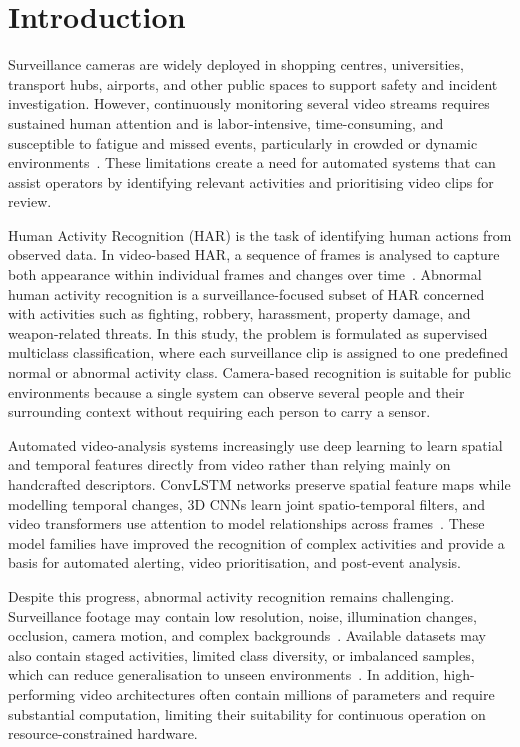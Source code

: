\documentclass[journal,article,submit,moreauthors]{Definitions/mdpi}
\begin{document}
    \section{Introduction}
    \label{sec:introduction}

    Surveillance cameras are widely deployed in shopping centres, universities, transport 
    hubs, airports, and other public spaces to support safety and incident investigation. 
    However, continuously monitoring several video streams requires sustained human 
    attention and is labor-intensive, time-consuming, and susceptible to fatigue and 
    missed events, particularly in crowded or dynamic 
    environments~\cite{arshad2022,mohan2019}. These limitations create a need for 
    automated systems that can assist operators by identifying relevant activities and 
    prioritising video clips for review.

    Human Activity Recognition (HAR) is the task of identifying human actions from 
    observed data. In video-based HAR, a sequence of frames is analysed to capture both 
    appearance within individual frames and changes over time~\cite{ozyer2021,khan2022}. 
    Abnormal human activity recognition is a surveillance-focused subset of HAR concerned 
    with activities such as fighting, robbery, harassment, property damage, and 
    weapon-related threats. In this study, the problem is formulated as supervised 
    multiclass classification, where each surveillance clip is assigned to one predefined 
    normal or abnormal activity class. Camera-based recognition is suitable for public 
    environments because a single system can observe several people and their surrounding 
    context without requiring each person to carry a sensor.

    Automated video-analysis systems increasingly use deep learning to learn spatial and 
    temporal features directly from video rather than relying mainly on handcrafted 
    descriptors. ConvLSTM networks preserve spatial feature maps while modelling temporal 
    changes, 3D CNNs learn joint spatio-temporal filters, and video transformers use 
    attention to model relationships across 
    frames~\cite{xingjian2015convlstm,vrskova2022,tran2018closer,liu2022videoswin}. 
    These model families have improved the recognition of complex activities and provide 
    a basis for automated alerting, video prioritisation, and post-event analysis.

    Despite this progress, abnormal activity recognition remains challenging. 
    Surveillance footage may contain low resolution, noise, illumination changes, occlusion, 
    camera motion, and complex backgrounds~\cite{sunil2021,vrskova2022}. Available datasets 
    may also contain staged activities, limited class diversity, or imbalanced samples, 
    which can reduce generalisation to unseen environments~\cite{cheng2020,arshad2022}. 
    In addition, high-performing video architectures often contain millions of parameters 
    and require substantial computation, limiting their suitability for continuous 
    operation on resource-constrained hardware.
\end{document}
